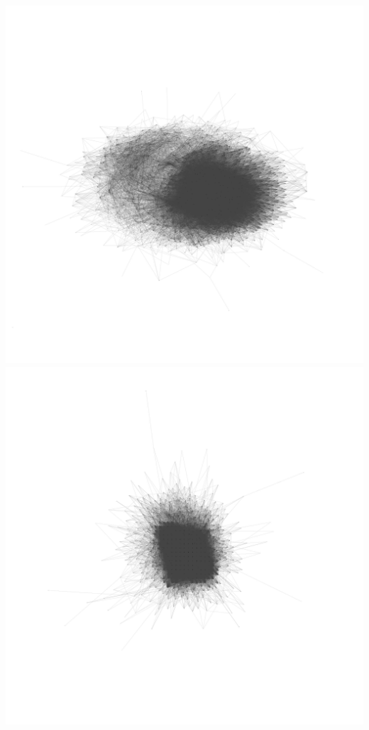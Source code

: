 \documentclass[12pt, a4paper]{article}
\begin{document}
\begin{multicols}{2}
  {\centering
  \includegraphics[width=\columnwidth]{src/youtube/hdg/comp/5_plot_kk}\\
  \label{fig:hdg_c5}}
  {\centering
  \includegraphics[width=\columnwidth]{src/youtube/hdg/comp/6_plot_ghopt}\\
  \label{fig:hdg_c6}}
\end{multicols}
\end{document}
